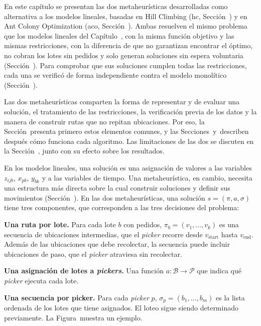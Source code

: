 \startchapter[title={Metaheurísticas}, reference=Capitulo_4]

En este capítulo se presentan las dos metaheurísticas desarrolladas como
alternativa a los modelos lineales, basadas en Hill Climbing (\ac{hc},
Sección~\in[sec:hc]) y en Ant Colony Optimization (\ac{aco},
Sección~).
Ambas resuelven el mismo problema que los modelos
lineales del Capítulo~\in[Capitulo_3], con la misma función objetivo y las
mismas restricciones, con la diferencia de que no garantizan encontrar el
óptimo, no cobran los lotes sin pedidos y solo generan soluciones sin espera voluntaria (Sección~).
Para comprobar que sus soluciones cumplen todas las restricciones, cada una se
verificó de forma independiente contra el modelo monolítico (Sección~).

Las dos metaheurísticas comparten la forma de representar y de evaluar una
solución, el tratamiento de las restricciones, la verificación previa de los
datos y la manera de construir rutas que no repitan ubicaciones. Por eso, la
Sección~ presenta primero estos elementos comunes, y las
Secciones~\in[sec:hc] y~ describen después cómo funciona cada
algoritmo. Las limitaciones de las dos se discuten en la
Sección~, junto con su efecto sobre los resultados.

\startsection[title={Elementos comunes}, reference=sec:heur_comunes]

\startsubsection[title={Representación de la solución}, reference=sec:heur_representacion]

En los modelos lineales, una solución es una asignación de valores a las variables
$z_{ijb}$, $x_{pb}$, $y_{bk}$ y a las variables de tiempo. Una metaheurística, en
cambio, necesita una estructura más directa sobre la cual construir soluciones
y definir sus movimientos (Sección~). En las dos
metaheurísticas, una solución $s = (\pi, a, \sigma)$ tiene tres componentes,
que corresponden a las tres decisiones del problema:
\startitemize[n]
	\item {\bf Una ruta por lote.} Para cada lote $b$ con pedidos,
	$\pi_b = (v_1, \dots, v_k)$ es una secuencia de ubicaciones intermedias,
	que el {\em picker} recorre desde $v_{\text{start}}$ hasta
	$v_{\text{end}}$. Además de las ubicaciones que debe recolectar, la
	secuencia puede incluir ubicaciones de paso, que el {\em picker}
	atraviesa sin recolectar.
	\item {\bf Una asignación de lotes a {\em pickers}.} Una función
	$a : \mathcal{B} \to \mathcal{P}$ que indica qué {\em picker} ejecuta cada
	lote.
	\item {\bf Una secuencia por picker.} Para cada {\em picker} $p$,
	$\sigma_p = (b_1, \dots, b_m)$ es la lista ordenada de los lotes que tiene
	asignados.
\stopitemize
El loteo sigue siendo determinado previamente. La Figura~
muestra un ejemplo.

